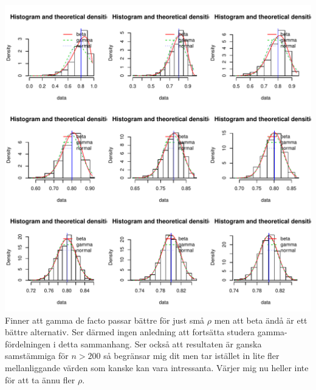 \documentclass[]{article}
\begin{document}
\includegraphics{2016_w09_files/figure-latex/unnamed-chunk-12-3.pdf}
Finner att gamma de facto passar bättre för just små \(\rho\) men att
beta ändå är ett bättre alternativ. Ser därmed ingen anledning att
fortsätta studera gamma-fördelningen i detta sammanhang. Ser också att
resultaten är ganska samstämmiga för \(n> 200\) så begränsar mig dit men
tar istället in lite fler mellanliggande värden som kanske kan vara
intressanta. Värjer mig nu heller inte för att ta ännu fler \(\rho\).
\end{document}
